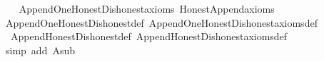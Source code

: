 \begin{isabellebody}
%
\isadelimproof
\ \ %
\endisadelimproof
%
\isatagproof
{}\isamarkupfalse%
\ Append{\isacharunderscore}{\kern0pt}One{\isacharunderscore}{\kern0pt}Honest{\isacharunderscore}{\kern0pt}Dishonest{\isacharunderscore}{\kern0pt}axioms\ Honest{\isacharunderscore}{\kern0pt}Append{\isacharunderscore}{\kern0pt}axioms\isanewline
\ \ \isamarkupfalse%
\ Append{\isacharunderscore}{\kern0pt}One{\isacharunderscore}{\kern0pt}Honest{\isacharunderscore}{\kern0pt}Dishonest{\isacharunderscore}{\kern0pt}def\ Append{\isacharunderscore}{\kern0pt}One{\isacharunderscore}{\kern0pt}Honest{\isacharunderscore}{\kern0pt}Dishonest{\isacharunderscore}{\kern0pt}axioms{\isacharunderscore}{\kern0pt}def\ \isanewline
\ \ Append{\isacharunderscore}{\kern0pt}Honest{\isacharunderscore}{\kern0pt}Dishonest{\isacharunderscore}{\kern0pt}def\ Append{\isacharunderscore}{\kern0pt}Honest{\isacharunderscore}{\kern0pt}Dishonest{\isacharunderscore}{\kern0pt}axioms{\isacharunderscore}{\kern0pt}def\ \isanewline
\ \ \isamarkupfalse%
\ {\isacharparenleft}{\kern0pt}simp\ add{\isacharcolon}{\kern0pt}\ A{}{\isacharunderscore}{\kern0pt}sub{\isacharparenright}{\kern0pt}%
\endisatagproof
{\isafoldproof}%
%
\isadelimproof
\isanewline
%
\endisadelimproof
\ \ \isanewline
%
\isadelimtheory
\isanewline
%
\endisadelimtheory
%
\isatagtheory
{}\isamarkupfalse%
%
\endisatagtheory
{\isafoldtheory}%
%
\isadelimtheory
%
\endisadelimtheory
%
\end{isabellebody}%
\endinput
